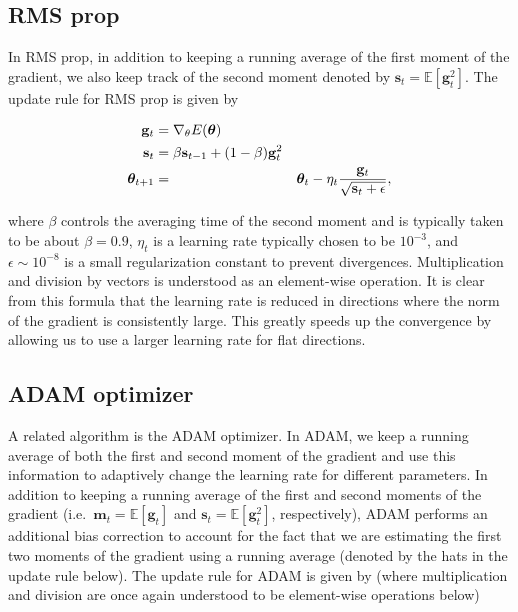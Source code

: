 \documentclass[%
oneside,                 %
final,                   %
10pt]{article}
\begin{document}
\subsection{RMS prop}

In RMS prop, in addition to keeping a running average of the first
moment of the gradient, we also keep track of the second moment
denoted by $\mathbf{s}_t=\mathbb{E}[\mathbf{g}_t^2]$. The update rule
for RMS prop is given by

\begin{align}
\mathbf{g}_t &= \nabla_\theta E(\boldsymbol{\theta}) \\
\mathbf{s}_t &=\beta \mathbf{s}_{t-1} +(1-\beta)\mathbf{g}_t^2 \nonumber \\
\boldsymbol{\theta}_{t+1}&=&\boldsymbol{\theta}_t - \eta_t { \mathbf{g}_t \over \sqrt{\mathbf{s}_t +\epsilon}}, \nonumber
\end{align}

where $\beta$ controls the averaging time of the second moment and is
typically taken to be about $\beta=0.9$, $\eta_t$ is a learning rate
typically chosen to be $10^{-3}$, and $\epsilon\sim 10^{-8} $ is a
small regularization constant to prevent divergences. Multiplication
and division by vectors is understood as an element-wise operation. It
is clear from this formula that the learning rate is reduced in
directions where the norm of the gradient is consistently large. This
greatly speeds up the convergence by allowing us to use a larger
learning rate for flat directions.


\subsection{ADAM optimizer}

A related algorithm is the ADAM optimizer. In ADAM, we keep a running
average of both the first and second moment of the gradient and use
this information to adaptively change the learning rate for different
parameters. In addition to keeping a running average of the first and
second moments of the gradient
(i.e.~$\mathbf{m}_t=\mathbb{E}[\mathbf{g}_t]$ and
$\mathbf{s}_t=\mathbb{E}[\mathbf{g}^2_t]$, respectively), ADAM
performs an additional bias correction to account for the fact that we
are estimating the first two moments of the gradient using a running
average (denoted by the hats in the update rule below). The update
rule for ADAM is given by (where multiplication and division are once
again understood to be element-wise operations below)
\end{document}
